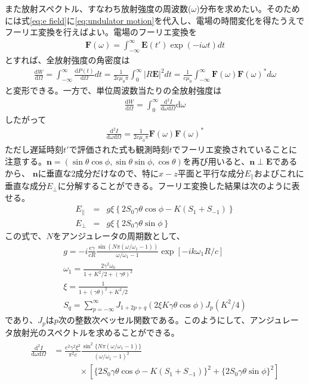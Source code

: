 \documentclass[a4paper,11pt,uplatex]{jsbook}
\begin{document}
また放射スペクトル、すなわち放射強度の周波数($\omega$)分布を求めたい。そのためには式\ref{eq:e field}に\ref{eq:undulator motion}を代入し、電場の時間変化を得たうえでフーリエ変換を行えばよい。電場のフーリエ変換を
\begin{eqnarray}
  \bm{F}(\omega) = \int_{-\infty}^{\infty} \bm{E}(t')\exp(-i\omega t)dt
\end{eqnarray}
とすれば、全放射強度の角密度は
\begin{eqnarray}
  \frac{\text{d}W}{\text{d}\Omega} = \int_{-\infty}^{\infty} \frac{\text{d}P(t)}{\text{d}\Omega}dt = \frac{1}{2c\mu_0\pi}\int_{0}^{\infty} \left|R\bm{E}\right|^2 dt 
  = \frac{1}{c\mu_0}\int_{-\infty}^{\infty} \bm{F}(\omega)\bm{F}(\omega)^*d\omega
\end{eqnarray}
と変形できる。一方で、単位周波数当たりの全放射強度は
\begin{eqnarray}
  \frac{\text{d}W}{\text{d}\Omega} = \int_{0}^{\infty}\frac{\text{d}^2I}{\text{d}\omega \text{d}\Omega}\text{d}\omega
\end{eqnarray}
したがって
\begin{eqnarray}
  \frac{\text{d}^2I}{\text{d}\omega \text{d}\Omega} = \frac{1}{2c\mu_0\pi}\bm{F}(\omega)\bm{F}(\omega)^*
\end{eqnarray}
ただし遅延時刻$t'$で評価された式も観測時刻$t$でフーリエ変換されていることに注意する。$\bm{n} =(\sin\theta\cos\phi,\sin\theta\sin\phi,\cos\theta)$を再び用いると、$\bm{n}\perp\bm{E}$であるから、
$\bm{n}$に垂直な2成分だけなので、特に$x-z$平面と平行な成分$E_{\parallel}$およびこれに垂直な成分$E_{\perp}$に分解することができる。フーリエ変換した結果は次のように表せる。
\begin{eqnarray}
  E_\parallel &=& g\xi\left\{2S_0\gamma \theta \cos\phi - K (S_1 + S_{-1})\right\}\\
  E_\perp &=& g\xi\left\{2S_0\gamma \theta \sin \phi\right\}
\end{eqnarray}
この式で、$N$をアンジュレータの周期数として、
\begin{eqnarray}
  g = -i \frac{e\gamma}{cR} \frac{\sin \left( N\pi (\omega/\omega_1 -1) \right)}{\omega/\omega_1 -1}\exp\left[-ik\omega_1 R/c \right]\\
  \omega_1 = \frac{2\gamma^2\omega_0}{1+K^2/2 + (\gamma\theta)^2}\\
  \xi = \frac{1}{1 + (\gamma\theta)^2 + K^2/2} \\
  S_q = \sum_{p = -\infty}^{\infty} J_{1+2p+q}(2\xi K\gamma\theta\cos\phi)J_p(K^2/4)
\end{eqnarray}
であり、$J_p$は$p$次の整数次ベッセル関数である。このようにして、アンジュレータ放射光のスペクトルを求めることができる。
\begin{eqnarray}\label{eq:spectrum}
  \begin{split}
   \frac{\text{d}^2I}{\text{d}\omega \text{d}\Omega} &= \frac{e^2\gamma^2\xi^2}{\pi^2 c}\frac{\sin^2 \{N\pi(\omega/\omega_1 -1)\}}{(\omega/\omega_1 -1)^2}\\
   &~~~~~~~~~~~~~~\times\left[ \{2S_0\gamma\theta\cos\phi - K(S_1 + S_{-1})\}^2 + \{2S_0\gamma \theta \sin \phi\}^2 \right]
  \end{split}
\end{eqnarray}
\end{document}

